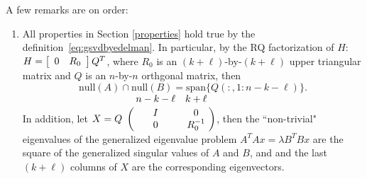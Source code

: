 \noindent A few remarks are on order: 

\begin{enumerate} 

            
            
\item All properties in Section \ref{properties} hold true 
by the definition~\eqref{eq:gsvdbyedelman}. 
In particular, by the RQ factorization of $H$: 
$H = \left[ \begin{array}{cc} 0 & R_0 \end{array} \right]Q^T$, 
where $R_0$ is an $(k+\ell)$-by-$(k+\ell)$ upper triangular matrix 
and $Q$ is an $n$-by-$n$ orthgonal matrix, then 
\[
\mbox{null}(A) \cap \mbox{null}(B) = \mbox{span}\{Q(:,1:n-k-\ell)\}.
\] 
In addition, let
 $X = Q\bordermatrix{ & n-k-\ell & k+\ell   \cr
                       \hfill & I & 0 \cr
                       \hfill & 0 & R_0^{-1} }$, then
the  ``non-trivial" eigenvalues of the generalized eigenvalue problem 
$A^T A x = \lambda B^T B x$ are the square of the 
generalized singular values of $A$ and $B$, 
and and the last $(k+\ell)$ columns of $X$ are the corresponding 
eigenvectors.  


\end{enumerate}
